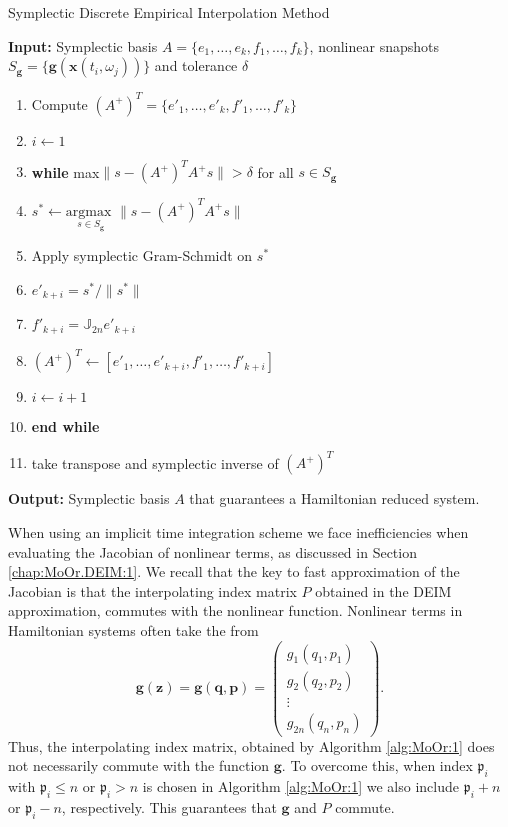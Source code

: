 \begin{algorithm} 
\caption{Symplectic Discrete Empirical Interpolation Method} \label{alg:SyMo:4}
{\bf Input:} Symplectic basis $A=\{ e_1,\dots,e_k,f_1,\dots,f_k \}$, nonlinear snapshots $S_{\mathbf g} = \{ \mathbf g(\mathbf x(t_i,\omega_j)) \}$ and tolerance $\delta$
\begin{enumerate}
\item Compute $(A^+)^T = \{ e'_1,\dots,e'_k,f'_1,\dots,f'_k \}$
\item $i \leftarrow 1$
\item \textbf{while} max$\| s - (A^+)^T A^+s \| > \delta$ for all $s\in S_{\mathbf g}$
\item \hspace{0.5cm} $s^* \leftarrow \underset{s \in S_{\mathbf g}}{\text{argmax }}\| s - (A^+)^T A^+ s \|$
\item \hspace{0.5cm} Apply symplectic Gram-Schmidt on $s^*$
\item \hspace{0.5cm} $e'_{k+i} = s^* / \| s^* \|$
\item \hspace{0.5cm} $f'_{k+i} = \mathbb J_{2n} e'_{k+i}$
\item \hspace{0.5cm} $(A^+)^T \leftarrow [e'_1,\dots,e'_{k+i},f'_1,\dots,f'_{k+i}]$
\item \hspace{0.5cm} $i\leftarrow i+1$
\item \textbf{end while}
\item take transpose and symplectic inverse of $(A^+)^T$
\end{enumerate}
\vspace{0.5cm}
{\bf Output:} Symplectic basis $A$ that guarantees a Hamiltonian reduced system.
\end{algorithm}

When using an implicit time integration scheme we face inefficiencies when evaluating the Jacobian of nonlinear terms, as discussed in Section \ref{chap:MoOr.DEIM:1}. We recall that the key to fast approximation of the Jacobian is that the interpolating index matrix $P$ obtained in the DEIM approximation, commutes with the nonlinear function. Nonlinear terms in Hamiltonian systems often take the from
\begin{equation}
	\mathbf g (\mathbf z) = \mathbf g (\mathbf q,\mathbf p) = 
	\begin{pmatrix}
		g_1(q_1,p_1) \\
		g_2(q_2,p_2) \\
		\vdots \\
		g_{2n}(q_{n},p_{n})
	\end{pmatrix}.
\end{equation}
Thus, the interpolating index matrix, obtained by Algorithm \ref{alg:MoOr:1} does not necessarily commute with the function $\mathbf g$. To overcome this, when index $\mathfrak p_i$ with $\mathfrak p_i\leq n$ or $\mathfrak p_i>n$ is chosen in Algorithm \ref{alg:MoOr:1} we also include $\mathfrak p_i + n$ or $\mathfrak p_i-n$, respectively. This guarantees that $\mathbf g$ and $P$ commute.
